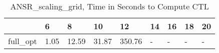 \begin{table}
\caption{ANSR\_scaling\_grid, Time in Seconds to Compute CTL}
\label{ANSR_scaling_grid_CTL_time}
\begin{tabular}{lllllllll}
\toprule
 & 6 & 8 & 10 & 12 & 14 & 16 & 18 & 20 \\
\midrule
full\_opt & 1.05 & 12.59 & 31.87 & 350.76 & - & - & - & - \\
\bottomrule
\end{tabular}
\end{table}
